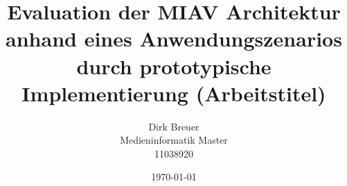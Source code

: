 \documentclass[12pt,headsepline,DIV12,BCOR12mm,a4paper,oneside,cleardoublestandard,openany,bibtotoc,liststotoc,halfparskip]{scrbook}
\begin{document}
\titlehead{
	{\large Fachhochschule Köln --- Campus Gummersbach\\
		\hfill }
	Steinmüllerallee~1\\
	51643 Gummersbach
	}
	\title{Evaluation der MIAV Architektur anhand eines Anwendungszenarios durch prototypische Implementierung (Arbeitstitel)}
	\author{Dirk Breuer\\Medieninformatik Master\\11038920}
	\publishers{
		\center
		\vspace{0.5cm}
		\large University of Applied Science of Cologne\\\textbf{Erstprüfer:} Prof. Dr. Mario Winter\\
		\large University of Applied Science of Cologne\\\textbf{Zweitprüfer:} Prof. Dr. Mario Winter\\
		\vspace{0.5cm}
    \large \href{mailto:dirk.breuer@gmail.com}{\emph{dirk.breuer@gmail.com}}
		}
	\date{\today}


\frontmatter

\newpage
% 
\newpage
% 

\mainmatter

% 
% 

% 
% 
% 
% 

\appendix

% 





\end{document}
